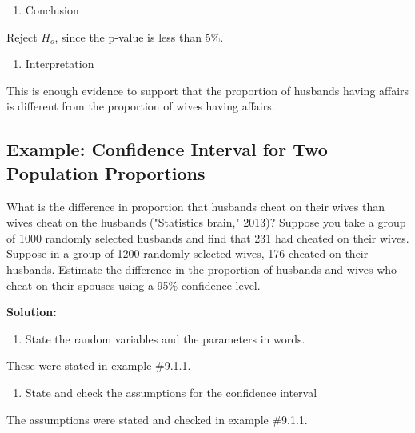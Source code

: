 \documentclass[
]{book}
\providecommand{\tightlist}{%
  \setlength{\itemsep}{0pt}\setlength{\parskip}{0pt}}
\begin{document}
\begin{enumerate}
\def\labelenumi{\arabic{enumi}.}
\setcounter{enumi}{4}
\tightlist
\item
  Conclusion
\end{enumerate}

Reject \(H_o\), since the p-value is less than 5\%.

\begin{enumerate}
\def\labelenumi{\arabic{enumi}.}
\setcounter{enumi}{5}
\tightlist
\item
  Interpretation
\end{enumerate}

This is enough evidence to support that the proportion of husbands having affairs is different from the proportion of wives having affairs.

\hypertarget{example-confidence-interval-for-two-population-proportions}{%
\subsection{Example: Confidence Interval for Two Population Proportions}\label{example-confidence-interval-for-two-population-proportions}}

What is the difference in proportion that husbands cheat on their wives than wives cheat on the husbands ("Statistics brain," 2013)? Suppose you take a group of 1000 randomly selected husbands and find that 231 had cheated on their wives. Suppose in a group of 1200 randomly selected wives, 176 cheated on their husbands. Estimate the difference in the proportion of husbands and wives who cheat on their spouses using a 95\% confidence level.

\textbf{Solution:}

\begin{enumerate}
\def\labelenumi{\arabic{enumi}.}
\tightlist
\item
  State the random variables and the parameters in words.
\end{enumerate}

These were stated in example \#9.1.1.

\begin{enumerate}
\def\labelenumi{\arabic{enumi}.}
\setcounter{enumi}{1}
\tightlist
\item
  State and check the assumptions for the confidence interval
\end{enumerate}

The assumptions were stated and checked in example \#9.1.1.
\end{document}

